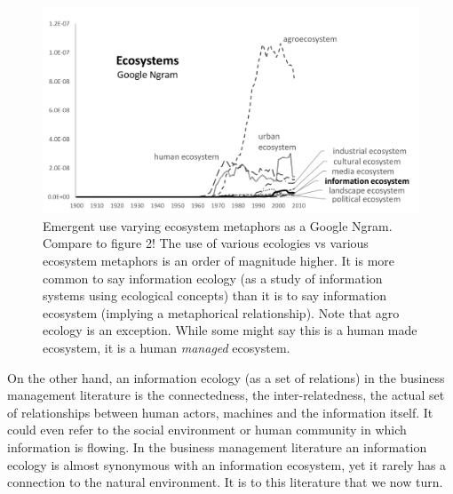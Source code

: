 \begin{figure}[!ht]
  \centering
    \includegraphics[width=5.5in]{figures/ecosystemsAll}
  \caption{Emergent use varying ecosystem metaphors as a Google Ngram. Compare to figure 2! The use of various ecologies vs various ecosystem metaphors is an order of magnitude higher. It is more common to say information ecology (as a study of information systems using ecological concepts) than it is to say information ecosystem (implying a metaphorical relationship). Note that agro ecology is an exception. While some might say this is a human made ecosystem, it is a human \textit{managed} ecosystem.}
\end{figure}

On the other hand, an information ecology (as a set of relations) in the business management literature is the connectedness, the inter-relatedness, the actual set of relationships between human actors, machines and the information itself. It could even refer to the social environment or human community in which information is flowing. In the business management literature an information ecology is almost synonymous with an information ecosystem, yet it rarely has a connection to the natural environment. It is to this literature that we now turn.